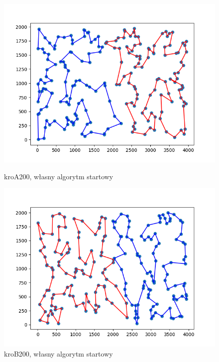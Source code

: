 \documentclass[11pt]{article}
\begin{document}
\begin{figure}[H]
    \vspace{0.5cm}

    \begin{minipage}[t]{0.45\textwidth}
        \centering
        \includegraphics[width=\linewidth]{best_paths/kroA200/traverse_greedy_shuffle/split_paths_regret_TSP.png}
        \caption{kroA200, własny algorytm startowy}
    \end{minipage}
    \hfill
    \begin{minipage}[t]{0.45\textwidth}
        \centering
        \includegraphics[width=\linewidth]{best_paths/kroB200/traverse_greedy_shuffle/split_paths_regret_TSP.png}
        \caption{kroB200, własny algorytm startowy}
    \end{minipage}
    \label{fig:minipage-greedy-vertex}
\end{figure}
\end{document}

